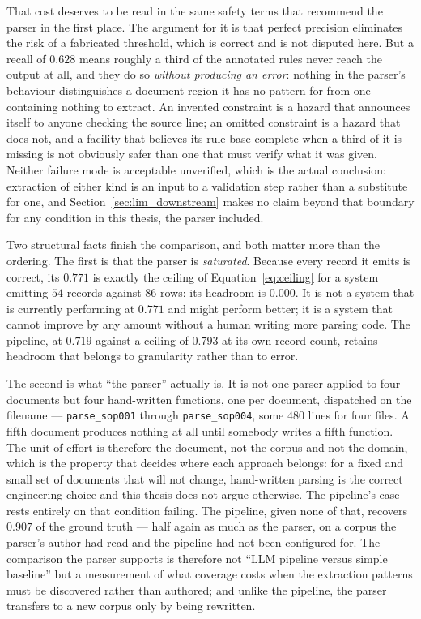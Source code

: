 \documentclass[11pt]{article}
\begin{document}
That cost deserves to be read in the same safety terms that recommend the parser
in the first place. The argument for it is that perfect precision eliminates the
risk of a fabricated threshold, which is correct and is not disputed here. But a
recall of $0.628$ means roughly a third of the annotated rules never reach the
output at all, and they do so \emph{without producing an error}: nothing in the
parser's behaviour distinguishes a document region it has no pattern for from
one containing nothing to extract. An invented constraint is a hazard that
announces itself to anyone checking the source line; an omitted constraint is a
hazard that does not, and a facility that believes its rule base complete when a
third of it is missing is not obviously safer than one that must verify what it
was given. Neither failure mode is acceptable unverified, which is the actual
conclusion: extraction of either kind is an input to a validation step rather
than a substitute for one, and Section~\ref{sec:lim_downstream} makes no claim
beyond that boundary for any condition in this thesis, the parser included.

Two structural facts finish the comparison, and both matter more than the
ordering. The first is that the parser is \emph{saturated}. Because every record
it emits is correct, its $0.771$ is exactly the ceiling of
Equation~\ref{eq:ceiling} for a system emitting $54$ records against $86$ rows:
its headroom is $0.000$. It is not a system that is currently performing at
$0.771$ and might perform better; it is a system that cannot improve by any
amount without a human writing more parsing code. The pipeline, at $0.719$
against a ceiling of $0.793$ at its own record count, retains headroom that
belongs to granularity rather than to error.

The second is what ``the parser'' actually is. It is not one parser applied to
four documents but four hand-written functions, one per document, dispatched on
the filename --- \texttt{parse\_sop001} through \texttt{parse\_sop004}, some
$480$ lines for four files. A fifth document produces nothing at all until
somebody writes a fifth function. The unit of effort is therefore the document,
not the corpus and not the domain, which is the property that decides where each
approach belongs: for a fixed and small set of documents that will not change,
hand-written parsing is the correct engineering choice and this thesis does not
argue otherwise. The pipeline's case rests entirely on that condition failing. The pipeline,
given none of that, recovers $0.907$ of the ground truth --- half again as much
as the parser, on a corpus the parser's author had read and the pipeline had
not been configured for. The comparison the
parser supports is therefore not ``LLM pipeline versus simple baseline'' but a
measurement of what coverage costs when the extraction patterns must be
discovered rather than authored; and unlike the pipeline, the parser transfers
to a new corpus only by being rewritten.
\end{document}
